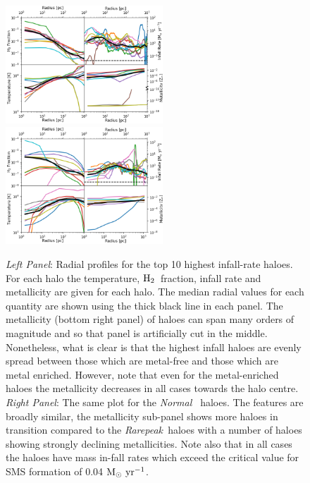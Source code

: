 \documentclass[graphics, twocolumn, usenatbib]{mn2e}
\newcommand{\msolaryrc} {$\rm{M_{\odot}~yr^{-1}}$}
\newcommand{\molH} {$\rm{H_2}$~}
\newcommand{\rarepeak} {\textit{Rarepeak~}}
\newcommand{\normal} {\textit{Normal~}}
\begin{document}
\begin{figure}
\centering
\begin{minipage}{175mm}      \begin{center} 
\centerline{
\includegraphics[width=0.525\textwidth]{FIGURES/MultiPlot_Rarepeak.png}
\includegraphics[width=0.525\textwidth]{FIGURES/MultiPlot_Normal.png}}
\caption{\textit{Left Panel}: Radial profiles for the top 10 highest infall-rate haloes. For
  each halo the temperature, \molH fraction, infall rate and metallicity are given for
  each halo. The median radial values for each quantity are shown using the
  thick black line in each panel. The metallicity (bottom right panel) of haloes can span many
  orders of magnitude and so that panel is artificially cut in the middle. Nonetheless, what is
  clear is that the highest infall haloes are evenly spread between those which are metal-free and
  those which are metal enriched. However, note that even for the metal-enriched haloes the
  metallicity decreases in all cases towards the halo centre. 
  \textit{Right Panel}: The same plot for the \normal
  haloes. The features are broadly similar, the metallicity sub-panel shows more haloes in transition
  compared to the \rarepeak haloes with a number of haloes showing strongly declining metallicities.
  Note also that in all cases the haloes have mass in-fall rates which exceed the critical value
  for SMS formation of 0.04 \msolaryrc.
} \label{Fig:RadialProfiles}
\end{center} \end{minipage}

\end{figure}
\end{document}

